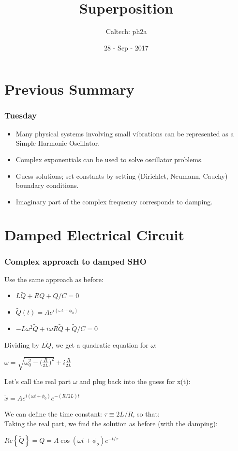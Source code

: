 \documentclass[pdf,hideothersubsections]{beamer}
\begin{document}
\title{Superposition}  
\author{Caltech: ph2a}
\date{28 - Sep - 2017}

\frame{\titlepage} 


\section{Previous Summary}
\begin{frame}
\frametitle{Tuesday}
\begin{itemize}
\item Many physical systems involving small vibrations can be represented as a Simple Harmonic Oscillator.

\item Complex exponentials can be used to solve oscillator problems.

\item Guess solutions; set constants by setting (Dirichlet, Neumann, Cauchy) boundary conditions.

\item Imaginary part of the complex frequency corresponds to damping.
\end{itemize}
\end{frame}


\section{Damped Electrical Circuit}
\begin{frame}
\frametitle{Complex approach to damped SHO}
Use the same approach as before:
\begin{itemize}
\item $L \ddot{Q} + R \dot{Q} + Q/C = 0$
\pause
\item $\tilde{Q}(t) = A e^{i (\omega t + \phi_0)}$
\pause
\item $-L \omega^2 \tilde{Q} + i \omega R \tilde{Q} + \tilde{Q}/C = 0$
\end{itemize}
\pause
Dividing by $L \tilde{Q}$, we get a quadratic equation for $\omega$: \\
\pause
\begin{center}
$\omega = \sqrt{\omega_0^2 - \Big(\frac{R}{2 L}\Big)^2} + i \frac{R}{2 L}$ \\
\end{center}
\pause
Let's call the real part $\omega$ and plug back into the guess for x(t):
\pause
\begin{center}
$\tilde{x} = A e^{i (\omega t + \phi_0)} e^{-(R/2 L) t}$\\
\end{center}
\pause
We can define the time constant: $\tau \equiv 2 L/R$, so that: \\
\pause
Taking the real part, we find the solution as before (with the damping): \\
\pause
\begin{center}
$Re\left\{\tilde{Q}\right\} = Q = A \cos(\omega t + \phi_o) e^{-t/\tau}$
\end{center}

\end{frame}
\end{document}

